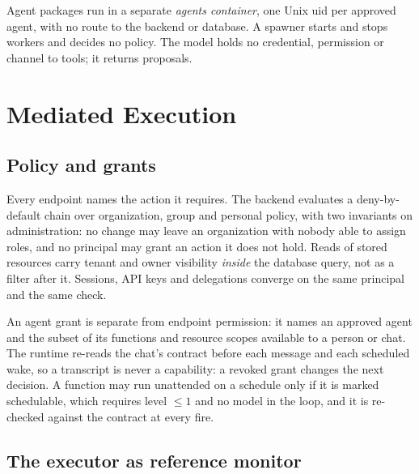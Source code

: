 \documentclass[10pt,twocolumn,a4paper]{article}
\begin{document}
Agent packages run in a separate \emph{agents container}, one Unix uid
per approved agent, with no route to the backend or database. A
spawner starts and stops workers and decides no policy. The model holds
no credential, permission or channel to tools; it returns proposals.

\section{Mediated Execution}
\label{sec:exec}

\subsection{Policy and grants}
Every endpoint names the action it requires. The backend evaluates a
deny-by-default chain over organization, group and personal policy,
with two invariants on administration: no change may leave an
organization with nobody able to assign roles, and no principal may
grant an action it does not hold. Reads of stored resources carry
tenant and owner visibility \emph{inside} the database query, not as a
filter after it. Sessions, API keys and delegations converge on the
same principal and the same check.

An agent grant is separate from endpoint permission: it names an
approved agent and the subset of its functions and resource scopes
available to a person or chat. The runtime re-reads the chat's contract
before each message and each scheduled wake, so a transcript is never a
capability: a revoked grant changes the next decision. A function may
run unattended on a schedule only if it is marked schedulable, which
requires level $\le 1$ and no model in the loop, and it is re-checked
against the contract at every fire.

\subsection{The executor as reference monitor}
\end{document}
